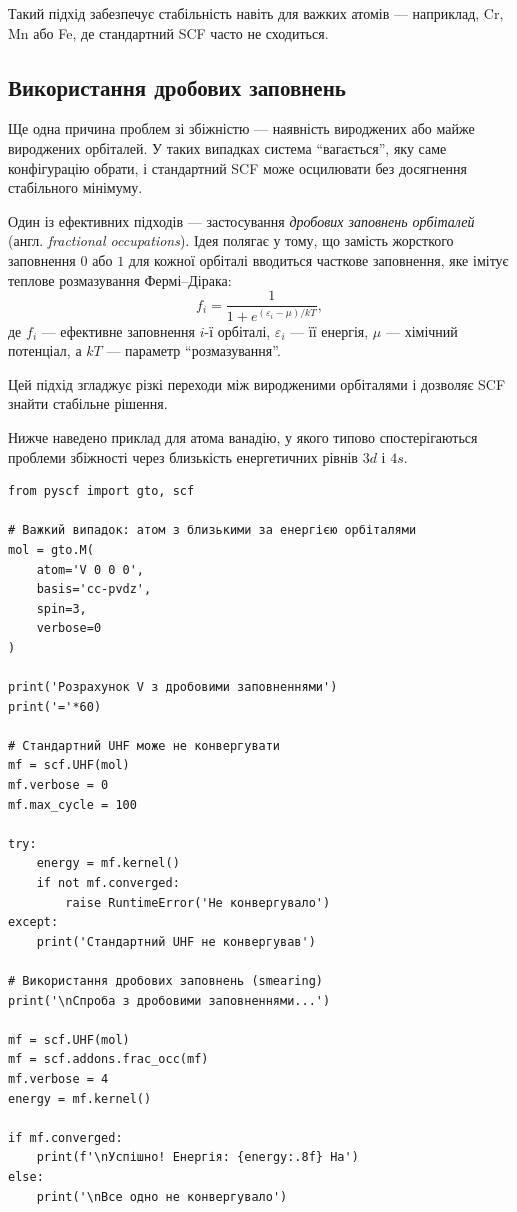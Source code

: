 Такий підхід забезпечує стабільність навіть для важких атомів --- наприклад, Cr, Mn або Fe, де стандартний SCF часто не сходиться.

\subsection{Використання дробових заповнень}

Ще одна причина проблем зі збіжністю --- наявність вироджених або майже вироджених орбіталей. У таких випадках система ``вагається'', яку саме конфігурацію обрати, і стандартний SCF може осцилювати без досягнення стабільного мінімуму.

Один із ефективних підходів --- застосування \textit{дробових заповнень орбіталей} (англ. \textit{fractional occupations}).
Ідея полягає у тому, що замість жорсткого заповнення $0$ або $1$ для кожної орбіталі вводиться часткове заповнення, яке імітує теплове розмазування Фермі–Дірака:
\[
    f_i = \frac{1}{1 + e^{(\varepsilon_i - \mu)/kT}},
\]
де $f_i$ --- ефективне заповнення $i$-ї орбіталі, $\varepsilon_i$ --- її енергія, $\mu$ --- хімічний потенціал, а $kT$ --- параметр ``розмазування''.

Цей підхід згладжує різкі переходи між виродженими орбіталями і дозволяє SCF знайти стабільне рішення.

Нижче наведено приклад для атома ванадію, у якого типово спостерігаються проблеми збіжності через близькість енергетичних рівнів $3d$ і $4s$.


\begin{verbatim}
from pyscf import gto, scf

# Важкий випадок: атом з близькими за енергією орбіталями
mol = gto.M(
    atom='V 0 0 0',
    basis='cc-pvdz',
    spin=3,
    verbose=0
)

print('Розрахунок V з дробовими заповненнями')
print('='*60)

# Стандартний UHF може не конвергувати
mf = scf.UHF(mol)
mf.verbose = 0
mf.max_cycle = 100

try:
    energy = mf.kernel()
    if not mf.converged:
        raise RuntimeError('Не конвергувало')
except:
    print('Стандартний UHF не конвергував')

# Використання дробових заповнень (smearing)
print('\nСпроба з дробовими заповненнями...')

mf = scf.UHF(mol)
mf = scf.addons.frac_occ(mf)
mf.verbose = 4
energy = mf.kernel()

if mf.converged:
    print(f'\nУспішно! Енергія: {energy:.8f} Ha')
else:
    print('\nВсе одно не конвергувало')
\end{verbatim}

